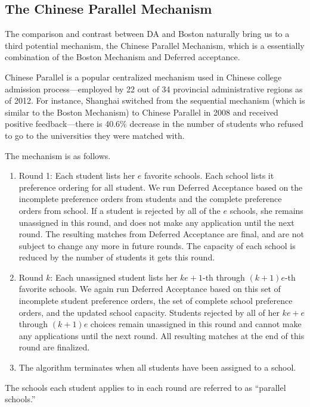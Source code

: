 \documentclass[10pt, reqno]{amsart}
\begin{document}
\subsection{The Chinese Parallel Mechanism}
The comparison and contrast between DA and Boston naturally bring us to a third potential mechanism, the Chinese Parallel Mechanism, which is a essentially combination of the Boston Mechanism and Deferred acceptance. 

Chinese Parallel is a popular centralized mechanism used in Chinese college admission process---employed by 22 out of 34 provincial administrative regions as of 2012. For instance, Shanghai switched from the sequential mechanism (which is similar to the Boston Mechanism) to Chinese Parallel in 2008 and received positive feedback---there is 40.6\% decrease in the number of students who refused to go to the universities they were matched with.

The mechanism is as follows.

\begin{enumerate}
  \item Round 1: Each student lists her $e$ favorite schools. Each school lists it preference ordering for all student. We run Deferred Acceptance based on the incomplete preference orders from students and the complete preference orders from school. If a student is rejected by all of the $e$ schools, she remains unassigned in this round, and does not make any application until the next round. The resulting matches from Deferred Acceptance are final, and are not subject to change any more in future rounds. The capacity of each school is reduced by the number of students it gets this round. 

  \item Round $k$: Each unassigned student lists her $ke+1$-th through $(k+1)e$-th favorite schools. We again run Deferred Acceptance based on this set of incomplete student preference orders, the set of complete school preference orders, and the updated school capacity. Students rejected by all of her $ke + e$ through $(k+1)e$ choices remain unassigned in this round and cannot make any applications until the next round. All resulting matches at the end of this round are finalized. 

  \item The algorithm terminates when all students have been assigned to a school.
\end{enumerate}
The schools each student applies to in each round are referred to as ``parallel schools.'' 
\end{document}
